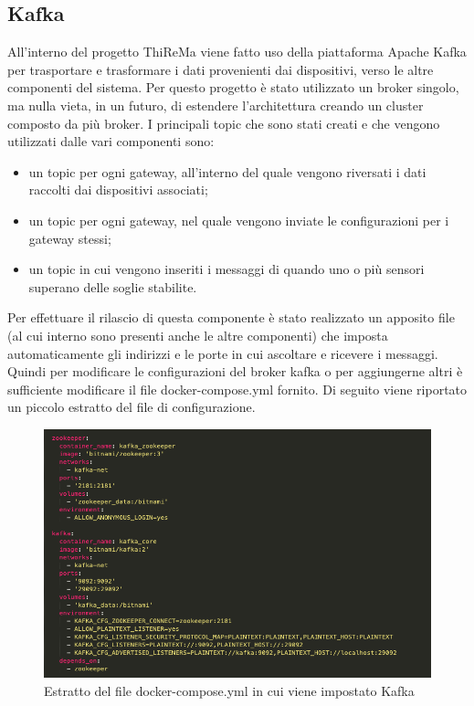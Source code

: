 \subsection{Kafka}
	All'interno del progetto ThiReMa viene fatto uso della piattaforma Apache Kafka per trasportare e trasformare i dati provenienti dai dispositivi, verso le altre componenti del sistema.
	\newline
	Per questo progetto è stato utilizzato un broker singolo, ma nulla vieta, in un futuro, di estendere l'architettura creando un cluster composto da più broker.
	\newline
	\newline
	I principali topic che sono stati creati e che vengono utilizzati dalle vari componenti sono:
	\begin{itemize}
		\item un topic per ogni gateway, all'interno del quale vengono riversati i dati raccolti dai dispositivi associati;
		\item un topic per ogni gateway, nel quale vengono inviate le configurazioni per i gateway stessi;
		\item un topic in cui vengono inseriti i messaggi di  quando uno o più sensori superano delle 
		soglie stabilite.
	\end{itemize}
	Per effettuare il rilascio di questa componente è stato realizzato un apposito file  (al cui interno sono presenti anche le altre componenti) che imposta automaticamente gli indirizzi e le porte in cui ascoltare e ricevere i messaggi. Quindi per modificare le configurazioni del broker kafka o per aggiungerne altri è sufficiente modificare il file docker-compose.yml fornito.
	\newline
	Di seguito viene riportato un piccolo estratto del file di configurazione.

		\begin{figure}[H]
			\centering
			\includegraphics[scale=0.470]{res/images/estrattoKafka_dockerCompose.png}
			\caption{Estratto del file docker-compose.yml in cui viene impostato Kafka}
			\label{Immagine 1}
		\end{figure}
	\pagebreak
